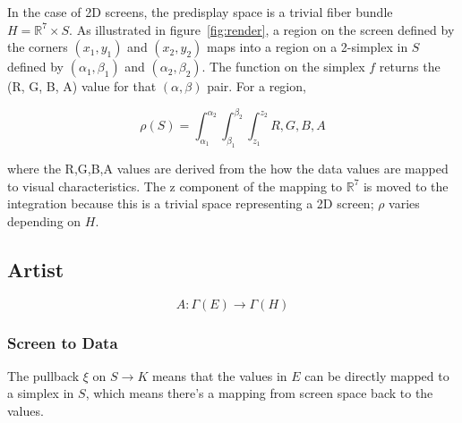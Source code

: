 \documentclass[../intro.tex]{subfiles}
\begin{document}


In the case of 2D screens, the predisplay space is a trivial fiber bundle $H=\mathbb{R}^{7}\times S$. As illustrated in figure~\ref{fig:render}, a region on the screen defined by the corners $(x_1, y_1)$ and $(x_2, y_2)$ maps into a region on a 2-simplex in $S$ defined by $(\alpha_1, \beta_1)$ and $(\alpha_2, \beta_2)$. The function on the simplex $f$ returns the (R, G, B, A) value for that $(\alpha, \beta)$ pair. For a region, 

\begin{equation*}
\rho(S) = \int_{\alpha_1}^{\alpha_2}\int_{\beta_1}^{\beta_2}\int_{z_1}^{z_2}{R, G, B, A}  
\end{equation*}

where the R,G,B,A values are derived from the how the data values are mapped to visual characteristics. The z component of the mapping to $\mathbb{R}^7$ is moved to the integration because this is a trivial space representing a 2D screen; $\rho$ varies depending on $H$. 


\subsection{Artist}
\begin{equation}
    A: \Gamma(E) \rightarrow \Gamma(H)
\end{equation}

\subsubsection{Screen to Data}

The pullback $\xi$ on $S \rightarrow K$ means that the values in $E$ can be directly mapped to a simplex in $S$, which means there's a mapping from screen space back to the values. 
\end{document}
